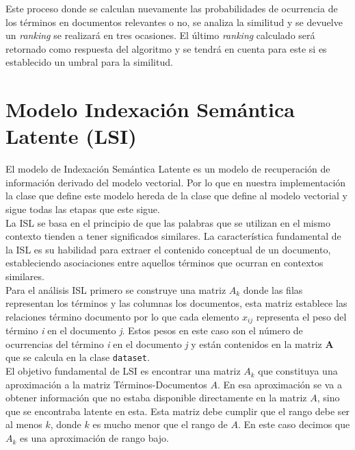 \documentclass[spanish]{article}
\begin{document}
			Este proceso donde se calculan nuevamente las probabilidades de ocurrencia de los términos en documentos relevantes o no, se analiza la similitud y se devuelve un \emph{ranking} se realizará en tres ocasiones. El último \emph{ranking} calculado será retornado como respuesta del algoritmo y se tendrá en cuenta para este si es establecido un umbral para la similitud.


\section*{ Modelo Indexación Semántica Latente (LSI)}

El modelo de Indexación Semántica Latente es un modelo de recuperación de información derivado del modelo vectorial. Por lo que en nuestra implementación la clase que define este modelo hereda de la clase que define al modelo vectorial y sigue todas las etapas que este sigue.\\

La ISL se basa en el principio de que las palabras que se utilizan en el mismo contexto tienden a tener significados similares. La característica fundamental de la ISL es su habilidad para extraer el contenido conceptual de un documento, estableciendo asociaciones entre aquellos términos que ocurran en contextos similares. \\

Para el análisis ISL primero se construye una matriz ${\displaystyle A_{k}}$ donde las filas representan los términos y las columnas los documentos, esta matriz establece las relaciones término documento por lo que cada elemento  $x_{ij}$  representa el peso del término \textit{i} en el documento \textit{j}. Estos pesos en este caso son el número de ocurrencias del término \textit{i} en el documento \textit{j} y están contenidos en la matriz \textbf{A} que se calcula en la clase \texttt{dataset}.\\

El objetivo fundamental de LSI es encontrar una matriz ${\displaystyle A_{k}}$ que constituya una aproximación a la matriz Términos-Documentos ${\displaystyle A}$. En esa aproximación se va a obtener información que no estaba disponible directamente en la matriz ${\displaystyle A}$, sino que se encontraba latente en esta. Esta matriz debe cumplir que el rango debe ser al menos ${\displaystyle k}$, donde ${\displaystyle k}$ es mucho menor que el rango de ${\displaystyle A}$. En este caso decimos que ${\displaystyle A_{k}}$ es una aproximación de rango bajo.\\
\end{document}
